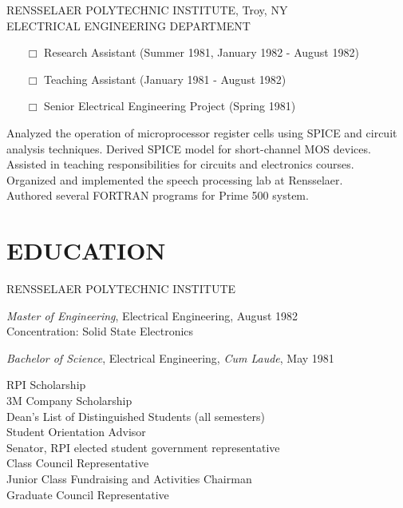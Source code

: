 \documentclass[11pt]{res} %
\begin{document}
\begin{resume}
    RENSSELAER POLYTECHNIC INSTITUTE, Troy, NY  \\
    ELECTRICAL ENGINEERING DEPARTMENT 
    \begin{itemize} \itemsep -4pt
    \item[$\Box$]   Research Assistant (Summer 1981, January 1982 - August 
        1982) %
    \item[$\Box$]    Teaching Assistant (January 1981 - August 1982) 
     \item[$\Box$]   Senior Electrical Engineering Project (Spring 1981) 
 \end{itemize}
    Analyzed the operation of microprocessor register cells using 
    SPICE and circuit \\ analysis techniques. Derived SPICE model 
    for short-channel MOS devices. \\
    Assisted in teaching responsibilities for circuits and 
    electronics courses. \\
    Organized and implemented the speech processing lab at 
    Rensselaer. \\
    Authored several FORTRAN programs for Prime 500 system. 
 
\section{EDUCATION} 
    RENSSELAER POLYTECHNIC INSTITUTE 

    {\it Master of Engineering}, Electrical Engineering, August 1982 \\
    Concentration: Solid State Electronics 

    {\it Bachelor of Science}, Electrical Engineering, {\it Cum Laude}, May 
    1981 

    RPI Scholarship  \\
    3M Company Scholarship \\  
    Dean's List of Distinguished Students (all semesters)  \\
    Student Orientation Advisor \\
    Senator, RPI elected student government representative \\
    Class Council Representative \\
    Junior Class Fundraising and Activities Chairman \\
    Graduate Council Representative 
 
\end{resume}
\end{document}
